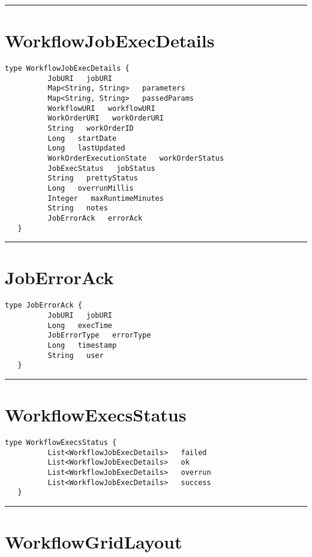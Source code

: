 \rule{12cm}{2pt}
\section{WorkflowJobExecDetails}
\label{type:WorkflowJobExecDetails}

\begin{lstlisting}[style=nonumbers]
   type WorkflowJobExecDetails {
          JobURI   jobURI
          Map<String, String>   parameters
          Map<String, String>   passedParams
          WorkflowURI   workflowURI
          WorkOrderURI   workOrderURI
          String   workOrderID
          Long   startDate
          Long   lastUpdated
          WorkOrderExecutionState   workOrderStatus
          JobExecStatus   jobStatus
          String   prettyStatus
          Long   overrunMillis
          Integer   maxRuntimeMinutes
          String   notes
          JobErrorAck   errorAck
   }
\end{lstlisting}

\rule{12cm}{2pt}
\section{JobErrorAck}
\label{type:JobErrorAck}

\begin{lstlisting}[style=nonumbers]
   type JobErrorAck {
          JobURI   jobURI
          Long   execTime
          JobErrorType   errorType
          Long   timestamp
          String   user
   }
\end{lstlisting}

\rule{12cm}{2pt}
\section{WorkflowExecsStatus}
\label{type:WorkflowExecsStatus}

\begin{lstlisting}[style=nonumbers]
   type WorkflowExecsStatus {
          List<WorkflowJobExecDetails>   failed
          List<WorkflowJobExecDetails>   ok
          List<WorkflowJobExecDetails>   overrun
          List<WorkflowJobExecDetails>   success
   }
\end{lstlisting}

\rule{12cm}{2pt}
\section{WorkflowGridLayout}
\label{type:WorkflowGridLayout}

